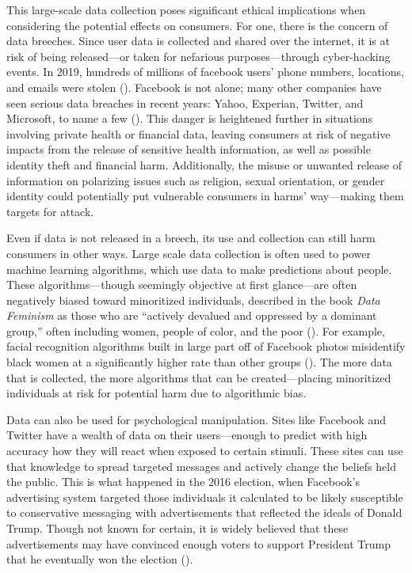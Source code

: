 \documentclass[water,article,submit,moreauthors,pdftex]{mdpi}
\begin{document}
This large-scale data collection poses significant ethical implications
when considering the potential effects on consumers. For one, there is
the concern of data breeches. Since user data is collected and shared
over the internet, it is at risk of being released---or taken for
nefarious purposes---through cyber-hacking events. In 2019, hundreds of
millions of facebook users' phone numbers, locations, and emails were
stolen (\citet{fb-breach}). Facebook is not alone; many other companies
have seen serious data breaches in recent years: Yahoo, Experian,
Twitter, and Microsoft, to name a few (\citet{breaches-history}). This
danger is heightened further in situations involving private health or
financial data, leaving consumers at risk of negative impacts from the
release of sensitive health information, as well as possible identity
theft and financial harm. Additionally, the misuse or unwanted release
of information on polarizing issues such as religion, sexual
orientation, or gender identity could potentially put vulnerable
consumers in harms' way---making them targets for attack.

Even if data is not released in a breech, its use and collection can
still harm consumers in other ways. Large scale data collection is often
used to power machine learning algorithms, which use data to make
predictions about people. These algorithms---though seemingly objective
at first glance---are often negatively biased toward minoritized
individuals, described in the book \emph{Data Feminism} as those who are
``actively devalued and oppressed by a dominant group,'' often including
women, people of color, and the poor (\citet{d2020data}). For example,
facial recognition algorithms built in large part off of Facebook photos
misidentify black women at a significantly higher rate than other groups
(\citet{buolamwini2018gender}). The more data that is collected, the
more algorithms that can be created---placing minoritized individuals at
risk for potential harm due to algorithmic bias.

Data can also be used for psychological manipulation. Sites like
Facebook and Twitter have a wealth of data on their users---enough to
predict with high accuracy how they will react when exposed to certain
stimuli. These sites can use that knowledge to spread targeted messages
and actively change the beliefs held the public. This is what happened
in the 2016 election, when Facebook's advertising system targeted those
individuals it calculated to be likely susceptible to conservative
messaging with advertisements that reflected the ideals of Donald Trump.
Though not known for certain, it is widely believed that these
advertisements may have convinced enough voters to support President
Trump that he eventually won the election (\citet{fb-election}).
\end{document}
